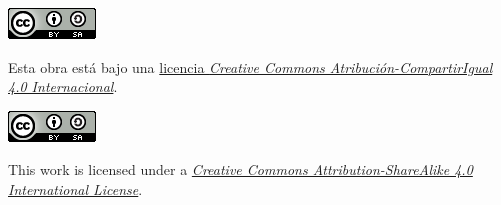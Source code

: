 \vfill


{\footnotesize \setlength{\parindent}{0pt}

  \begin{minipage}{.2\linewidth}
    \href{http://creativecommons.org/licenses/by-sa/4.0/}{\includegraphics[width=\linewidth]{frontmatter/cc-88x31}}
  \end{minipage}\hfill
  \begin{minipage}{.78\linewidth}
    Esta obra está bajo una
    \href{http://creativecommons.org/licenses/by-sa/4.0/}{licencia
      \emph{Creative Commons Atribución-CompartirIgual 4.0
        Internacional}}.
  \end{minipage}

  \medskip

  \begin{minipage}{.2\linewidth}
    \href{http://creativecommons.org/licenses/by-sa/4.0/}{\includegraphics[width=\linewidth]{frontmatter/cc-88x31}}
  \end{minipage}\hfill
  \begin{minipage}{.78\linewidth}
    This work is licensed under a
    \href{http://creativecommons.org/licenses/by-sa/4.0/}{\emph{Creative
        Commons Attribution-ShareAlike 4.0 International License}}.
  \end{minipage}

}

